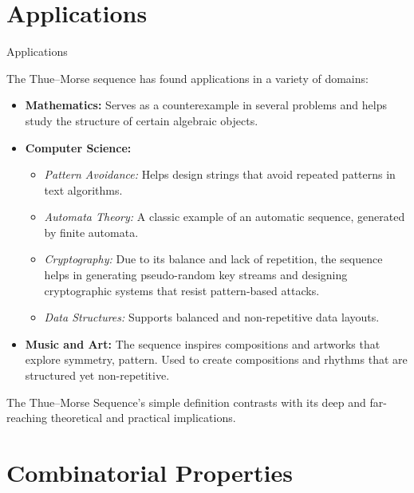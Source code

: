 \documentclass{beamer}
\begin{document}
\section{Applications}

\begin{frame}{Applications}
    
    The Thue--Morse sequence has found applications in a variety of domains:
    
    \begin{itemize}
        \item \textbf{Mathematics:} Serves as a counterexample in several problems and helps study the structure of certain algebraic objects.
        
        \item \textbf{Computer Science:}
        \begin{itemize}
            \item \textit{Pattern Avoidance:} Helps design strings that avoid repeated patterns in text algorithms.
            \item \textit{Automata Theory:} A classic example of an automatic sequence, generated by finite automata.
            \item \textit{Cryptography:} Due to its balance and lack of repetition, the sequence helps in generating pseudo-random key streams and designing cryptographic systems that resist pattern-based attacks.
            \item \textit{Data Structures:} Supports balanced and non-repetitive data layouts.
        \end{itemize}
        
        \item \textbf{Music and Art:} The sequence inspires compositions and artworks that explore symmetry, pattern. Used to create compositions and rhythms that are structured yet non-repetitive.
    \end{itemize}

    
    \vspace{0.5em}
    \small
    The Thue--Morse Sequence’s simple definition contrasts with its deep and far-reaching theoretical and practical implications.

\end{frame}

\section{Combinatorial Properties}
\end{document}
